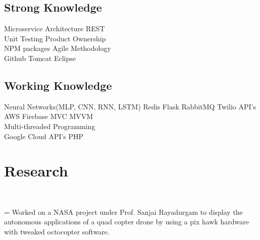 \documentclass[]{rinkal_resume}
\begin{document}
\begin{minipage}[t]{0.30\textwidth}
\vspace{1pt}
\subsection{Strong Knowledge}
\vspace{1pt}
Microservice Architecture \textbullet{}
REST \textbullet{} \\
Unit Testing \textbullet{}
Product Ownership \textbullet{} \\
NPM packages \textbullet{}
Agile Methodology \textbullet{} \\
Github \textbullet{} 
Tomcat \textbullet{}
Eclipse %
\sectionsep

\vspace{1pt}
\subsection{Working Knowledge}
\vspace{1pt}
Neural Networks(MLP, CNN, RNN, LSTM)  \textbullet{}
Redis \textbullet{}
Flask \textbullet{}
RabbitMQ \textbullet{}
Twilio API's \textbullet{}
AWS \textbullet{}
Firebase \textbullet{}
MVC \textbullet{}
MVVM \textbullet{} \\
Multi-threaded Programming  \textbullet{} \\
Google Cloud API's\textbullet{} 
PHP %
\sectionsep


\section{Research}
 \\

\newlength\boxwid
\settowidth{\boxwid}{\indent\hspace{0.5cm}}

\hspace{0.2cm} \hangindent=\boxwid 
\textbullet{} Worked on a NASA project under Prof. Sanjai Rayadurgam to display the autonomous applications of a quad copter drone by using a pix hawk hardware with tweaked octocopter software. \\


\end{minipage}
\end{document}
